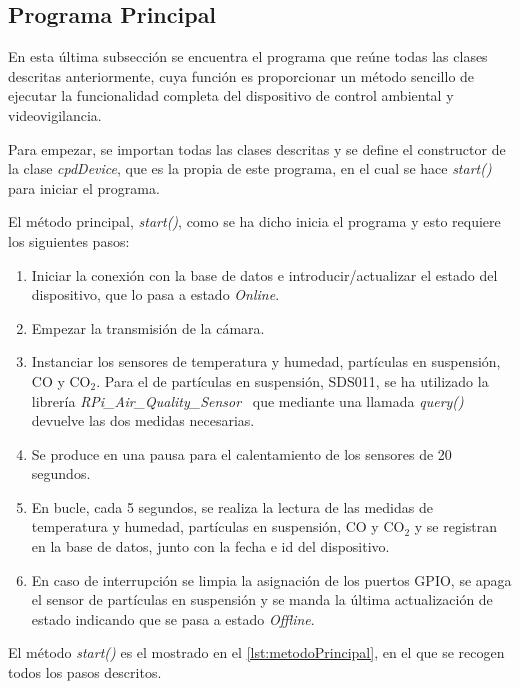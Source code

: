 \subsection{Programa Principal}\label{subsec:programa-principal}
En esta última subsección se encuentra el programa que reúne todas las clases descritas anteriormente, cuya función es proporcionar un método sencillo de ejecutar la funcionalidad completa del dispositivo de control ambiental y videovigilancia.

Para empezar, se importan todas las clases descritas y se define el constructor de la clase \textit{cpdDevice}, que es la propia de este programa, en el cual se hace \textit{start()} para iniciar el programa.

El método principal, \textit{start()}, como se ha dicho inicia el programa y esto requiere los siguientes pasos:
\begin{enumerate}
	\item Iniciar la conexión con la base de datos e introducir/actualizar el estado del dispositivo, que lo pasa a estado \textit{Online}.
	\item Empezar la transmisión de la cámara.
	\item Instanciar los sensores de temperatura y humedad, partículas en suspensión, CO y CO$_2$. Para el de partículas en suspensión, SDS011, se ha utilizado la librería \textit{RPi\_Air\_Quality\_Sensor}~\cite{rovai_python4ds_2021} que mediante una llamada \textit{query()} devuelve las dos medidas necesarias.
	\item Se produce en una pausa para el calentamiento de los sensores de 20 segundos.
	\item En bucle, cada 5 segundos, se realiza la lectura de las medidas de temperatura y humedad, partículas en suspensión, CO y CO$_2$ y se registran en la base de datos, junto con la fecha e id del dispositivo.
	\item En caso de interrupción se limpia la asignación de los puertos GPIO, se apaga el sensor de partículas en suspensión y se manda la última actualización de estado indicando que se pasa a estado \textit{Offline}.
\end{enumerate}

El método \textit{start()} es el mostrado en el \autoref{lst:metodoPrincipal}, en el que se recogen todos los pasos descritos.
\pagebreak

